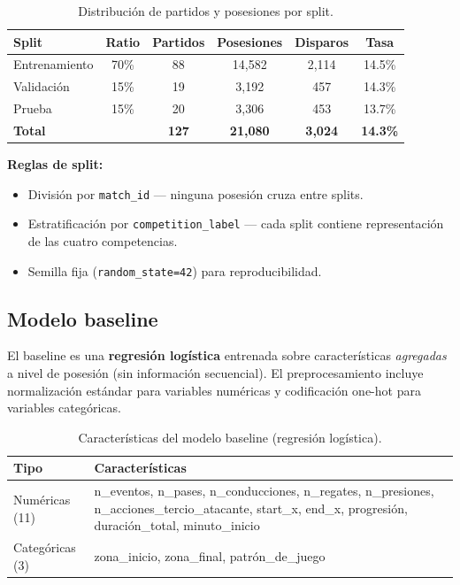 \documentclass[12pt,a4paper]{article}
\newcommand{\code}[1]{\texttt{\small #1}}
\begin{document}
\begin{table}[H]
\centering
\caption{Distribución de partidos y posesiones por split.}
\begin{tabular}{lccccc}
\toprule
\textbf{Split} & \textbf{Ratio} & \textbf{Partidos} & \textbf{Posesiones} & \textbf{Disparos} & \textbf{Tasa} \\
\midrule
Entrenamiento  & 70\% & 88 & 14{,}582 & 2{,}114 & 14.5\% \\
Validación     & 15\% & 19 &  3{,}192 &   457   & 14.3\% \\
Prueba         & 15\% & 20 &  3{,}306 &   453   & 13.7\% \\
\midrule
\textbf{Total} &      & \textbf{127} & \textbf{21{,}080} & \textbf{3{,}024} & \textbf{14.3\%} \\
\bottomrule
\end{tabular}
\label{tab:splits}
\end{table}

\textbf{Reglas de split:}
\begin{itemize}[leftmargin=1.5em, noitemsep]
    \item División por \texttt{match\_id} — ninguna posesión cruza entre splits.
    \item Estratificación por \code{competition\_label} — cada split contiene
          representación de las cuatro competencias.
    \item Semilla fija (\code{random\_state=42}) para reproducibilidad.
\end{itemize}

\subsection{Modelo baseline}

El baseline es una \textbf{regresión logística} entrenada sobre características
\emph{agregadas} a nivel de posesión (sin información secuencial). El preprocesamiento
incluye normalización estándar para variables numéricas y codificación one-hot para
variables categóricas.

\begin{table}[H]
\centering
\caption{Características del modelo baseline (regresión logística).}
\begin{tabularx}{\linewidth}{lX}
\toprule
\textbf{Tipo} & \textbf{Características} \\
\midrule
Numéricas (11) & n\_eventos, n\_pases, n\_conducciones, n\_regates, n\_presiones,
                 n\_acciones\_tercio\_atacante, start\_x, end\_x,
                 progresión, duración\_total, minuto\_inicio \\
Categóricas (3) & zona\_inicio, zona\_final, patrón\_de\_juego \\
\bottomrule
\end{tabularx}
\end{table}
\end{document}
